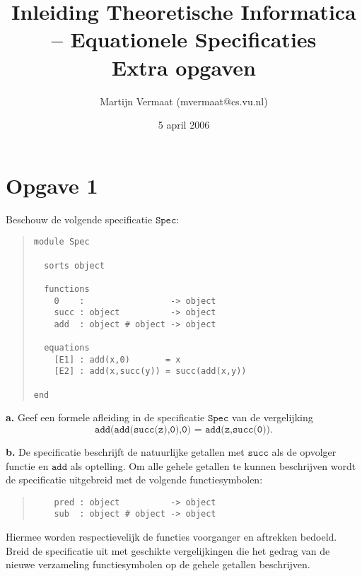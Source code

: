 \documentclass[a4paper,11pt]{article}
\title{Inleiding Theoretische Informatica -- Equationele Specificaties\\
\normalsize{Extra opgaven}}
\author{Martijn Vermaat (mvermaat@cs.vu.nl)}
\date{5 april 2006}
\begin{document}
\maketitle


\section*{Opgave 1}

Beschouw de volgende specificatie $\texttt{Spec}$:

\begin{quote}
\begin{verbatim}
module Spec

  sorts object

  functions
    0    :                 -> object
    succ : object          -> object
    add  : object # object -> object

  equations
    [E1] : add(x,0)       = x
    [E2] : add(x,succ(y)) = succ(add(x,y))

end 
\end{verbatim}
\end{quote}

\begin{description}

\item{\bf a.}
Geef een formele afleiding in de specificatie $\texttt{Spec}$ van de
vergelijking
\begin{displaymath}
\texttt{add(add(succ(z),0),0) = add(z,succ(0))}.
\end{displaymath}

\item{\bf b.}
De specificatie beschrijft de natuurlijke getallen met $\texttt{succ}$ als de
opvolger functie en $\texttt{add}$ als optelling. Om alle gehele getallen te
kunnen beschrijven wordt de specificatie uitgebreid met de volgende
functiesymbolen:

\begin{quote}
\begin{verbatim}
    pred : object          -> object
    sub  : object # object -> object
\end{verbatim}
\end{quote}

Hiermee worden respectievelijk de functies voorganger en aftrekken
bedoeld. Breid de specificatie uit met geschikte vergelijkingen die het gedrag
van de nieuwe verzameling functiesymbolen op de gehele getallen beschrijven.

\end{description}
\end{document}
